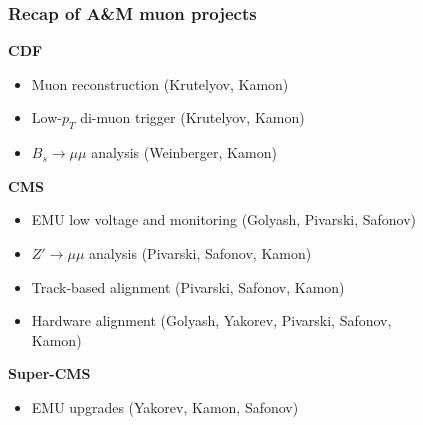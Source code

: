 \documentclass[compress]{beamer}
\begin{document}
\begin{frame}
\frametitle{Recap of A\&M muon projects}

{\bf CDF}

\begin{itemize}
  \item Muon reconstruction (Krutelyov, Kamon)
  \item Low-$p_T$ di-muon trigger (Krutelyov, Kamon)
  \item $B_s\to\mu\mu$ analysis (Weinberger, Kamon)
\end{itemize}

{\bf CMS}

\begin{itemize}
  \item EMU low voltage and monitoring (Golyash, Pivarski, Safonov)
  \item $Z'\to\mu\mu$ analysis (Pivarski, Safonov, Kamon)
  \item Track-based alignment (Pivarski, Safonov, Kamon)
  \item Hardware alignment (Golyash, Yakorev, Pivarski, Safonov, \\ \hfill Kamon)
\end{itemize}

\vspace{-\baselineskip}
{\bf Super-CMS}

\begin{itemize}
  \item EMU upgrades (Yakorev, Kamon, Safonov)
\end{itemize}

\label{numpages}
\end{frame}
\end{document}
